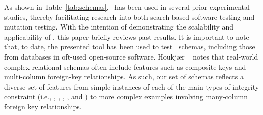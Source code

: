 


As shown in Table~\ref{tab:schemas}, \sa~has been used in several prior experimental studies, thereby facilitating
research into both search-based software testing and mutation testing. With the intention of demonstrating the
scalability and applicability of \sa, this paper briefly reviews past results. It is important to note that, to date,
the presented tool has been used to test \numtestedschemas~schemas, including those from databases in oft-used
open-source software. Houkj{\ae}r \etal~\cite{Houkjaer2006} notes that real-world complex relational schemas often
include features such as composite keys and multi-column foreign-key relationships. As such, our set of schemas reflects
a diverse set of features from simple instances of each of the main types of integrity constraint (i.e., \PKCs, \FKCs,
\UCs, \NNCs, and \CCs) to more complex examples involving many-column foreign key relationships.

